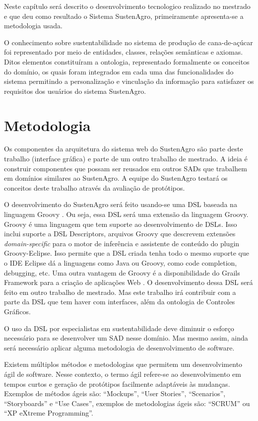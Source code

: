 Neste capítulo será descrito o desenvolvimento tecnologico realizado
no mestrado e que deu como resultado o Sistema SustenAgro, primeiramente
apresenta-se a metodologia usada.

O conhecimento sobre sustentabilidade no sistema de produção de cana-de-açúcar
foi representado por meio de entidades, classes, relações semânticas
e axiomas. Ditos elementos constituíram a ontologia, representado
formalmente os conceitos do domínio, os quais foram integrados em
cada uma das funcionalidades do sistema permitindo a personalização
e vinculação da informação para satisfazer os requisitos dos usuários
do sistema SustenAgro.

\section{Metodologia}

Os componentes da arquitetura do sistema web do SustenAgro são parte
deste trabalho (interface gráfica) e parte de um outro trabalho de
mestrado. A ideia é construir componentes que possam ser reusados
em outros SADs que trabalhem em domínios similares ao SustenAgro.
A equipe do SustenAgro testará os conceitos deste trabalho através
da avaliação de protótipos.

O desenvolvimento do SustenAgro será feito usando-se uma DSL baseada
na linguagem Groovy \citep{koenig2007groovy}. Ou seja, essa DSL será
uma extensão da linguagem Groovy. Groovy é uma linguagem que tem suporte
ao desenvolvimento de DSLs. Isso inclui suporte a DSL Descriptors,
arquivos Groovy que descrevem extensões \emph{domain-specific} para
o motor de inferência e assistente de conteúdo do plugin Groovy\nobreakdash-Eclipse.
Isso permite que a DSL criada tenha todo o mesmo suporte que o IDE
Eclipse dá a linguagens como Java ou Groovy, como code completion,
debugging, etc. Uma outra vantagem de Groovy é a disponibilidade do
Grails Framework para a criação de aplicações Web \citep{judd2008beginning}.
O desenvolvimento dessa DSL será feito em outro trabalho de mestrado.
Mas este trabalho irá contribuir com a parte da DSL que tem haver
com interfaces, além da ontologia de Controles Gráficos.

O uso da DSL por especialistas em sustentabilidade deve diminuir o
esforço necessário para se desenvolver um SAD nesse domínio. Mas mesmo
assim, ainda será necessário aplicar alguma metodologia de desenvolvimento
de software. 

Existem múltiplos métodos e metodologias que permitem um desenvolvimento
ágil de software. Nesse contexto, o termo ágil refere-se ao desenvolvimento
em tempos curtos e geração de protótipos facilmente adaptáveis às
mudanças. Exemplos de métodos ágeis são: “Mockups”, “User Stories”,
“Scenarios”, “Storyboards” e “Use Cases”, exemplos de metodologias
ágeis são: “SCRUM” ou “XP eXtreme Programming”.

